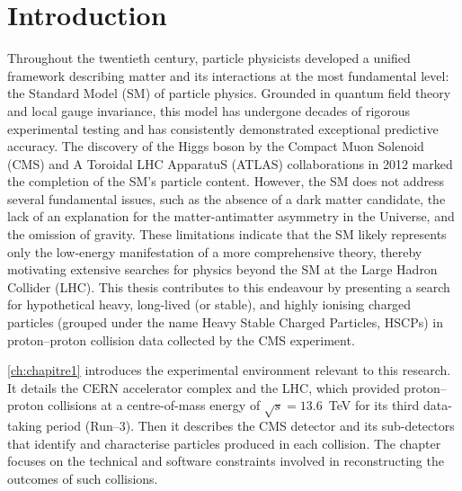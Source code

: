 \chapter*{Introduction}
\label{ch:introduction}


Throughout the twentieth century, particle physicists developed a unified framework describing matter and its interactions at the most fundamental level: the Standard Model (SM) of particle physics. Grounded in quantum field theory and local gauge invariance, this model has undergone decades of rigorous experimental testing and has consistently demonstrated exceptional predictive accuracy. The discovery of the Higgs boson by the Compact Muon Solenoid (CMS) and A Toroidal LHC ApparatuS (ATLAS) collaborations in 2012 marked the completion of the SM's particle content. However, the SM does not address several fundamental issues, such as the absence of a dark matter candidate, the lack of an explanation for the matter-antimatter asymmetry in the Universe, and the omission of gravity. These limitations indicate that the SM likely represents only the low-energy manifestation of a more comprehensive theory, thereby motivating extensive searches for physics beyond the SM at the Large Hadron Collider (LHC). This thesis contributes to this endeavour by presenting a search for hypothetical heavy, long-lived (or stable), and highly ionising charged particles (grouped under the name Heavy Stable Charged Particles, HSCPs) in proton--proton collision data collected by the CMS experiment.

\vspace{0.5 cm}

\cref{ch:chapitre1} introduces the experimental environment relevant to this research. It details the CERN accelerator complex and the LHC, which provided proton--proton collisions at a centre-of-mass energy of $\sqrt{s} = 13.6$~TeV for its third data-taking period (Run--3). Then it describes the CMS detector and its sub-detectors that identify and characterise particles produced in each collision. The chapter focuses on the technical and software constraints involved in reconstructing the outcomes of such collisions.

\vspace{0.5 cm}

